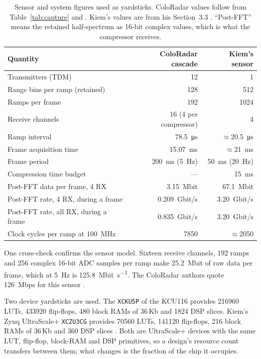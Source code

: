 \begin{table}[htbp]
\centering
\caption[Sensor and system yardsticks]{Sensor and system figures used as
yardsticks. ColoRadar values follow from Table~\ref{tab:capture} and
\cite{kramer2022}. Kiem's values are from his Section~3.3 \cite{kiem2025}.
``Post-FFT'' means the retained half-spectrum as 16-bit complex values, which
is what the compressor receives.}
\label{tab:hw_sensor}
\small
\begin{tabular}{@{}lrr@{}}
\toprule
Quantity & ColoRadar cascade & Kiem's sensor\\
\midrule
Transmitters (TDM)                   & 12 & 1\\
Range bins per ramp (retained)       & 128 & 512\\
Ramps per frame                      & 192 & 1024\\
Receive channels                     & 16 (4 per compressor) & 4\\
Ramp interval                        & \SI{78.5}{\micro\second} & $\approx$\SI{20.5}{\micro\second}\\
Frame acquisition time               & \SI{15.07}{\milli\second} & $\approx$\SI{21}{\milli\second}\\
Frame period                         & \SI{200}{\milli\second} (\SI{5}{\hertz}) & \SI{50}{\milli\second} (\SI{20}{\hertz})\\
Compression time budget              & --- & \SI{15}{\milli\second}\\
Post-FFT data per frame, 4 RX        & \SI{3.15}{\mega bit} & \SI{67.1}{\mega bit}\\
Post-FFT rate, 4 RX, during a frame  & \SI{0.209}{Gbit/s} & \SI{3.20}{Gbit/s}\\
Post-FFT rate, all RX, during a frame& \SI{0.835}{Gbit/s} & \SI{3.20}{Gbit/s}\\
Clock cycles per ramp at \SI{100}{\mega\hertz} & \num{7850} & $\approx$\num{2050}\\
\bottomrule
\end{tabular}
\end{table}

One cross-check confirms the sensor model. Sixteen receive channels, 192 ramps
and 256 complex 16-bit ADC samples per ramp make \SI{25.2}{\mega bit} of raw
data per frame, which at \SI{5}{\hertz} is \SI{125.8}{\mega bit\per\second}.
The ColoRadar authors quote \SI{126}{Mbps} for this sensor \cite{kramer2022}.

Two device yardsticks are used. The \texttt{XCKU5P} of the KCU116 provides
\num{216960} LUTs, \num{433920} flip-flops, 480 block RAMs of 36\,Kb and
\num{1824} DSP slices. Kiem's Zynq UltraScale+ \texttt{XCZU3CG} provides
\num{70560} LUTs, \num{141120} flip-flops, 216 block RAMs of 36\,Kb and
360 DSP slices \cite{kiem2025}. Both are UltraScale+ devices
with the same LUT, flip-flop, block-RAM and DSP primitives, so a design's
resource count transfers between them; what changes is the fraction of the chip
it occupies.

